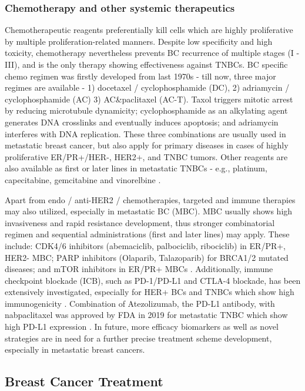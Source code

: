 \subsubsection{Chemotherapy and other systemic therapeutics}

Chemotherapeutic reagents preferentially kill cells which are highly proliferative by multiple proliferation-related manners. Despite low specificity and high toxicity, chemotherapy nevertheless prevents BC recurrence of multiple stages (I - III), and is the only therapy showing effectiveness against TNBCs. BC specific chemo regimen was firstly developed from last 1970s - till now, three major regimes are available - 1) docetaxel / cyclophosphamide (DC), 2) adriamycin / cyclophosphamide (AC) 3) AC\&paclitaxel (AC-T). Taxol triggers mitotic arrest by reducing microtubule dynamicity; cyclophosphamide as an alkylating agent generates DNA crosslinks and eventually induces apoptosis; and adriamycin interferes with DNA replication. These three combinations are usually used in metastatic breast cancer, but also apply for primary diseases in cases of highly proliferative ER/PR+/HER-, HER2+, and TNBC tumors. Other reagents are also available as first or later lines in metastatic TNBCs - e.g., platinum, capecitabine, gemcitabine and vinorelbine \citep{waks2019breast}.

Apart from endo / anti-HER2 / chemotherapies, targeted and immune therapies may also utilized, especially in metastatic BC (MBC). MBC usually shows high invasiveness and rapid resistance development, thus stronger combinatorial regimen and sequential administrations (first and later lines) may apply. These include: CDK4/6 inhibitors (abemaciclib, palbociclib, ribociclib) in ER/PR+, HER2- MBC; PARP inhibitors (Olaparib, Talazoparib) for BRCA1/2 mutated diseases; and mTOR inhibitors in ER/PR+ MBCs \citep{waks2019breast}. Additionally, immune checkpoint blockade (ICB), such as PD-1/PD-L1 and CTLA-4 blockade, has been extensively investigated, especially for HER+ BCs and TNBCs which show high immunogenicity \citep{adams2019current}. Combination of Atezolizumab, the PD-L1 antibody, with nabpaclitaxel was approved by FDA in 2019 for metastatic TNBC which show high PD-L1 expression \citep{schmid2018atezolizumab}. In future, more efficacy biomarkers as well as novel strategies are in need for a further precise treatment scheme development, especially in metastatic breast cancers.

\subsection{Breast Cancer Treatment}

